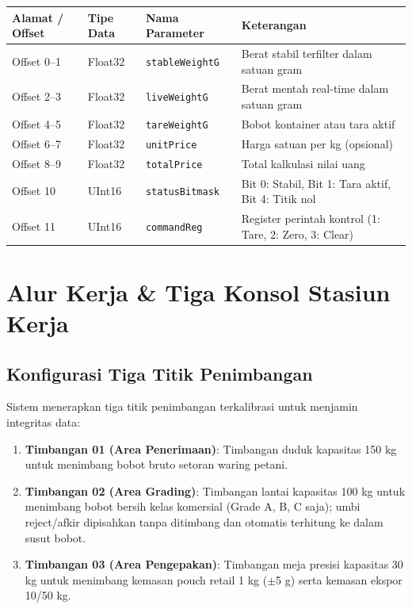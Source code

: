\documentclass[12pt,a4paper]{article}
\begin{document}
\begin{longtable}{@{}>{\raggedright\arraybackslash}p{2.8cm}>{\raggedright\arraybackslash}p{2.2cm}>{\raggedright\arraybackslash}p{3.2cm}>{\raggedright\arraybackslash}p{6.8cm}@{}}
\toprule
\textbf{Alamat / Offset} & \textbf{Tipe Data} & \textbf{Nama Parameter} & \textbf{Keterangan} \\
\midrule
\endhead
Offset 0--1 & Float32 & \texttt{stableWeightG} & Berat stabil terfilter dalam satuan gram \\
Offset 2--3 & Float32 & \texttt{liveWeightG} & Berat mentah real-time dalam satuan gram \\
Offset 4--5 & Float32 & \texttt{tareWeightG} & Bobot kontainer atau tara aktif \\
Offset 6--7 & Float32 & \texttt{unitPrice} & Harga satuan per kg (opsional) \\
Offset 8--9 & Float32 & \texttt{totalPrice} & Total kalkulasi nilai uang \\
Offset 10 & UInt16 & \texttt{statusBitmask} & Bit 0: Stabil, Bit 1: Tara aktif, Bit 4: Titik nol \\
Offset 11 & UInt16 & \texttt{commandReg} & Register perintah kontrol (1: Tare, 2: Zero, 3: Clear) \\
\bottomrule
\end{longtable}

\section{Alur Kerja \& Tiga Konsol Stasiun Kerja}

\subsection{Konfigurasi Tiga Titik Penimbangan}
Sistem menerapkan tiga titik penimbangan terkalibrasi untuk menjamin integritas data:
\begin{enumerate}
  \item \textbf{Timbangan 01 (Area Penerimaan)}: Timbangan duduk kapasitas 150 kg untuk menimbang bobot bruto setoran waring petani.
  \item \textbf{Timbangan 02 (Area Grading)}: Timbangan lantai kapasitas 100 kg untuk menimbang bobot bersih kelas komersial (Grade A, B, C saja); umbi reject/afkir dipisahkan tanpa ditimbang dan otomatis terhitung ke dalam susut bobot.
  \item \textbf{Timbangan 03 (Area Pengepakan)}: Timbangan meja presisi kapasitas 30 kg untuk menimbang kemasan pouch retail 1 kg ($\pm$5 g) serta kemasan ekspor 10/50 kg.
\end{enumerate}
\end{document}
